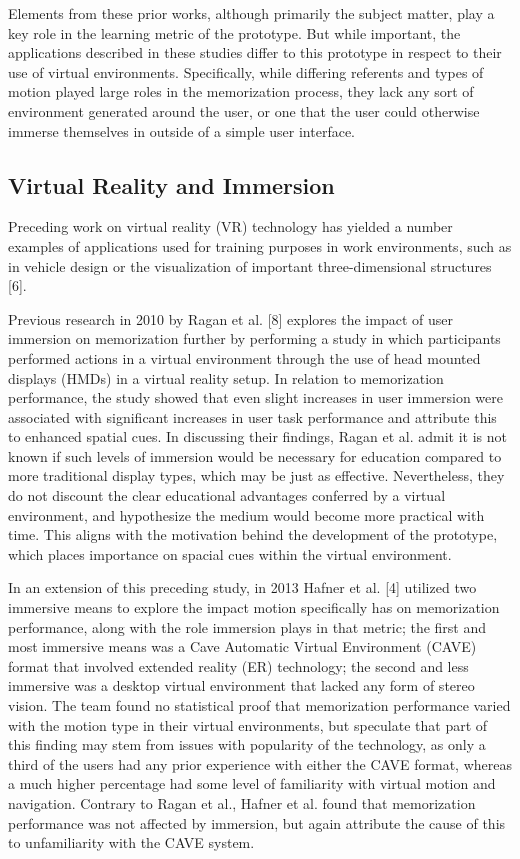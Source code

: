 \documentclass{vgtc}                          %
\begin{document}
Elements from these prior works, although primarily the subject matter, play a key role in the learning metric of the prototype. But while important, the applications described in these studies differ to this prototype in respect to their use of virtual environments. Specifically, while differing referents and types of motion played large roles in the memorization process, they lack any sort of environment generated around the user, or one that the user could otherwise immerse themselves in outside of a simple user interface.

\subsection{Virtual Reality and Immersion}

Preceding work on virtual reality (VR) technology has yielded a number examples of applications used for training purposes in work environments, such as in vehicle design or the visualization of important three-dimensional structures [6].

Previous research in 2010 by Ragan et al. [8] explores the impact of user immersion on memorization further by performing a study in which participants performed actions in a virtual environment through the use of head mounted displays (HMDs) in a virtual reality setup. In relation to memorization performance, the study showed that even slight increases in user immersion were associated with significant increases in user task performance and attribute this to enhanced spatial cues. In discussing their findings, Ragan et al. admit it is not known if such levels of immersion would be necessary for education compared to more traditional display types, which may be just as effective. Nevertheless, they do not discount the clear educational advantages conferred by a virtual environment, and hypothesize the medium would become more practical with time. This aligns with the motivation behind the development of the prototype, which places importance on spacial cues within the virtual environment.

In an extension of this preceding study, in 2013 Hafner et al. [4] utilized two immersive means to explore the impact motion specifically has on memorization performance, along with the role immersion plays in that metric; the first and most immersive means was a Cave Automatic Virtual Environment (CAVE) format that involved extended reality (ER) technology; the second and less immersive was a desktop virtual environment that lacked any form of stereo vision. The team found no statistical proof that memorization performance varied with the motion type in their virtual environments, but speculate that part of this finding may stem from issues with popularity of the technology, as only a third of the users had any prior experience with either the CAVE format, whereas a much higher percentage had some level of familiarity with virtual motion and navigation. Contrary to Ragan et al., Hafner et al. found that memorization performance was not affected by immersion, but again attribute the cause of this to unfamiliarity with the CAVE system. 
\end{document}

